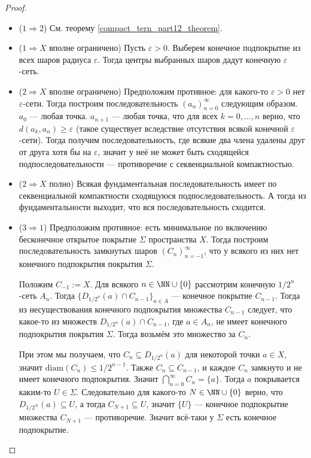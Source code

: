\documentclass[12pt,a4paper]{article}
\newcommand{\diam}{\ensuremath{\mathrm{diam}}\xspace}
\begin{document}
    \begin{proof}\ 
        \begin{itemize}
            \item ($1 \Rightarrow 2$) См. теорему \ref{compact_tern_part12_theorem}.
            \item ($1 \Rightarrow X$ вполне ограничено) Пусть $\varepsilon > 0$. Выберем конечное подпокрытие из всех шаров радиуса $\varepsilon$. Тогда центры выбранных шаров дадут конечную $\varepsilon$-сеть.
            \item ($2 \Rightarrow X$ вполне ограничено) Предположим противное: для какого-то $\varepsilon > 0$ нет $\varepsilon$-сети. Тогда построим последовательность $(a_n)_{n=0}^\infty$ следующим образом. $a_0$ --- любая точка. $a_{n+1}$ --- любая точка, что для всех $k = 0, \dots, n$ верно, что $d(a_k, a_n) \geqslant \varepsilon$ (такое существует вследствие отсутствия всякой конечной $\varepsilon$-сети). Тогда получим последовательность, где всякие два члена удалены друг от друга хотя бы на $\varepsilon$, значит у неё не может быть сходящейся подпоследовательности --- противоречие с секвенциальной компактностью.
            \item ($2 \Rightarrow X$ полно) Всякая фундаментальная последовательность имеет по секвенциальной компактности сходящуюся подпоследовательность. А тогда из фундаментальности выходит, что вся последовательность сходится.
            \item ($3 \Rightarrow 1$) Предположим противное: есть минимальное по включению бесконечное открытое покрытие $\Sigma$ пространства $X$. Тогда построим последовательность замкнутых шаров $(C_n)_{n=-1}^\infty$, что у всякого из них нет конечного подпокрытия покрытия $\Sigma$.
            
            Положим $C_{-1} := X$. Для всякого $n \in \NN \cup \{0\}$ рассмотрим конечную $1/2^n$-сеть $A_n$. Тогда $\{D_{1/2^n}(a) \cap C_{n-1}\}_{a \in A}$ --- конечное покрытие $C_{n-1}$. Тогда из несуществования конечного подпокрытия множества $C_{n-1}$ следует, что какое-то из множеств $D_{1/2^n}(a) \cap C_{n-1}$, где $a \in A_n$, не имеет конечного подпокрытия покрытия $\Sigma$. Тогда возьмём это множество за $C_n$.

            При этом мы получаем, что $C_n \subseteq D_{1/2^n}(a)$ для некоторой точки $a \in X$, значит $\diam(C_n) \leqslant 1/2^{n-1}$. Также $C_n \subseteq C_{n-1}$, и каждое $C_n$ замкнуто и не имеет конечного подпокрытия. Значит $\bigcap_{n=0}^\infty C_n = \{a\}$. Тогда $a$ покрывается каким-то $U \in \Sigma$. Следовательно для какого-то $N \in \NN \cup \{0\}$ верно, что $D_{1/2^N}(a) \subseteq U$, а тогда $C_{N+1} \subseteq U$, значит $\{U\}$ --- конечное подпокрытие множества $C_{N+1}$ --- противоречие. Значит всё-таки у $\Sigma$ есть конечное подпокрытие.
        \end{itemize}
    \end{proof}
\end{document}
